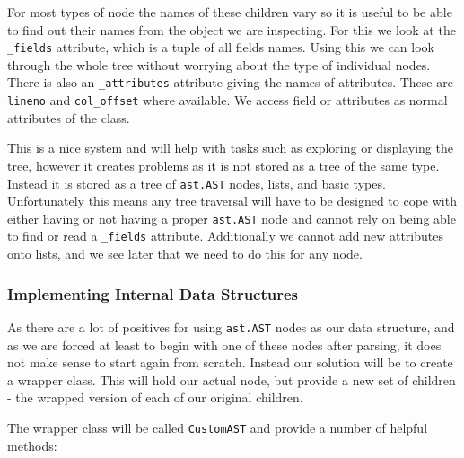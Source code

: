 \documentclass[twoside,a4paper]{report}
\begin{document}
For most types of node the names of these children vary so it is useful to be able to find out their names from the object we are inspecting. For this we
look at the \texttt{\_fields} attribute, which is a tuple of all fields names. Using this we can look through the whole tree without worrying about the type
of individual nodes. There is also an \texttt{\_attributes} attribute giving the names of attributes. These are \texttt{lineno} and \texttt{col\_offset} where
available. We access field or attributes as normal attributes of the class.

This is a nice system and will help with tasks such as exploring or displaying the tree, however it creates problems as it is not stored as a tree of the same
type. Instead it is stored as a tree of \texttt{ast.AST} nodes, lists, and basic types. Unfortunately this means any tree traversal will have to be designed to
cope with either having or not having a proper \texttt{ast.AST} node and cannot rely on being able to find or read a \texttt{\_fields} attribute. Additionally we
cannot add new attributes onto lists, and we see later that we need to do this for any node.

\subsubsection{Implementing Internal Data Structures}

As there are a lot of positives for using \texttt{ast.AST} nodes as our data structure, and as we are forced at least to begin with one of these nodes after parsing,
it does not make sense to start again from scratch. Instead our solution will be to create a wrapper class. This will hold our actual node, but provide a new set of
children - the wrapped version of each of our original children.

The wrapper class will be called \texttt{CustomAST} and provide a number of helpful methods:
\end{document}
